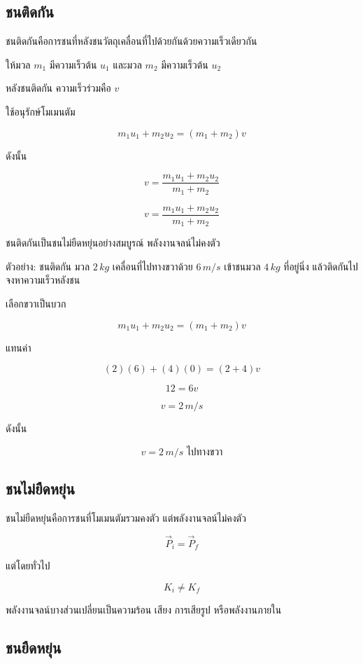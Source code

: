 \subsection{ชนติดกัน}

ชนติดกันคือการชนที่หลังชนวัตถุเคลื่อนที่ไปด้วยกันด้วยความเร็วเดียวกัน

ให้มวล $m_1$ มีความเร็วต้น $u_1$ และมวล $m_2$ มีความเร็วต้น $u_2$

หลังชนติดกัน ความเร็วร่วมคือ $v$

ใช้อนุรักษ์โมเมนตัม

\[
m_1u_1+m_2u_2=(m_1+m_2)v
\]

ดังนั้น

\[
v=\frac{m_1u_1+m_2u_2}{m_1+m_2}
\]

\begin{tcolorbox}[title=ชนติดกัน]
\[
v=\frac{m_1u_1+m_2u_2}{m_1+m_2}
\]

ชนติดกันเป็นชนไม่ยืดหยุ่นอย่างสมบูรณ์ พลังงานจลน์ไม่คงตัว
\end{tcolorbox}

\begin{examplebox}{ตัวอย่าง: ชนติดกัน}
มวล $2\,\si{kg}$ เคลื่อนที่ไปทางขวาด้วย $6\,\si{m/s}$ เข้าชนมวล $4\,\si{kg}$ ที่อยู่นิ่ง แล้วติดกันไป จงหาความเร็วหลังชน

เลือกขวาเป็นบวก

\[
m_1u_1+m_2u_2=(m_1+m_2)v
\]

แทนค่า

\[
(2)(6)+(4)(0)=(2+4)v
\]

\[
12=6v
\]

\[
v=2\,\si{m/s}
\]

ดังนั้น

\[
\boxed{v=2\,\si{m/s} \text{ ไปทางขวา}}
\]
\end{examplebox}

\subsection{ชนไม่ยืดหยุ่น}

ชนไม่ยืดหยุ่นคือการชนที่โมเมนตัมรวมคงตัว แต่พลังงานจลน์ไม่คงตัว

\[
\vec{P}_i=\vec{P}_f
\]

แต่โดยทั่วไป

\[
K_i\neq K_f
\]

พลังงานจลน์บางส่วนเปลี่ยนเป็นความร้อน เสียง การเสียรูป หรือพลังงานภายใน

\subsection{ชนยืดหยุ่น}

